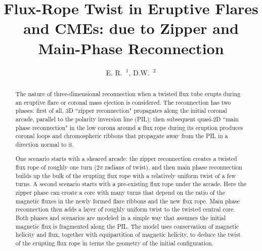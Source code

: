 \documentclass[10pt,namedreferneces]{SolarPhysics}
\begin{document}
\begin{article}
\begin{opening}
%
\title{Flux-Rope Twist in Eruptive Flares and CMEs: due to Zipper and Main-Phase Reconnection}

\author{E. R.~$^1$\sep 
D.W.~$^2$}




\begin{abstract} The nature of three-dimensional reconnection when a twisted flux tube erupts during an eruptive flare or coronal mass ejection is considered. The reconnection has two phases:  first of all, 3D ``zipper reconnection" propagates along the initial coronal arcade, parallel to the polarity inversion line (PIL); then subsequent  quasi-2D ``main phase reconnection" in the low corona around a flux rope during its eruption produces coronal loops and chromospheric ribbons that propagate away from the PIL in a direction normal to it.

One scenario starts with a sheared arcade: the zipper reconnection creates a twisted flux rope of roughly one turn ($2\pi$ radians of twist), and then main phase reconnection builds up the bulk of the erupting flux rope with a relatively uniform twist of a few turns.  A second scenario starts with a pre-existing flux rope under the arcade. 
Here the zipper phase can create a core with many turns that depend on the ratio of the magnetic fluxes in the newly formed flare ribbons and the new flux rope.
Main phase reconnection then adds a layer of roughly uniform twist to the twisted central core.  Both phases and scenarios are modeled in a simple way that 
assumes the initial magnetic flux is fragmented along the PIL. The model
uses conservation of magnetic helicity and flux, together with equipartition of magnetic helicity, to deduce the twist of the erupting flux rope in terms the geometry of the initial configuration.


\end{abstract}
\end{opening}
\end{article}
\end{document}
